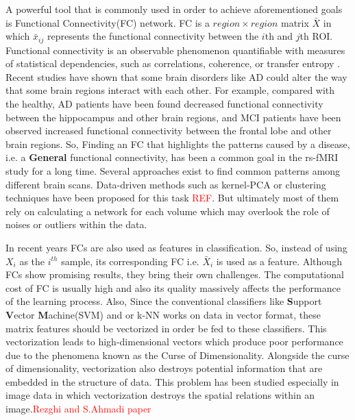 \documentclass[preprint,12pt]{elsarticle}
\begin{document}
	A powerful tool that is commonly used in order to achieve aforementioned goals is Functional Connectivity(FC) network.  FC is a $region \times region$ matrix $\bar{X}$ in which $\bar{x}_{ij}$ represents the functional connectivity between the $i$th and $j$th ROI. Functional connectivity is an observable
		phenomenon quantifiable with measures of statistical dependencies, such as correlations, coherence, or transfer entropy \cite{r38}.  Recent studies have shown that some brain disorders like AD could alter the way that some brain regions interact with each other. For example, compared with the healthy, AD patients have been found decreased functional connectivity between the hippocampus and other brain regions, and MCI patients have been observed increased functional connectivity between the frontal lobe and other brain regions\cite{r04}.
		So, Finding an FC that highlights the patterns caused by a disease, i.e. a \textbf{General} functional connectivity, has been a common goal in the rs-fMRI study for a long time. Several approaches exist to find common patterns among different brain scans. Data-driven methods such as kernel-PCA or clustering techniques have been proposed for this task \textcolor{red}{REF}. But ultimately most of them rely on calculating a network for each volume which may overlook the role of noises or outliers within the data\cite{r53,r54}. 
	
		In recent years FCs are also used as features in classification. 
		So, instead of using $X_i$ as the $i^{th}$ sample, its corresponding  FC i.e. $\bar{X}_i$ is used as a feature. Although FCs show promising results, they bring their own challenges.  The computational cost of FC is usually high and also its quality massively affects the performance of the learning process. Also, Since the conventional classifiers like \textbf{S}upport \textbf{V}ector \textbf{M}achine(SVM) and or k-NN works on data in vector format, these matrix features should be vectorized in order be fed to these classifiers.
		This vectorization leads to high-dimensional vectors which produce poor performance due to the phenomena known as the Curse of Dimensionality. Alongside the curse of dimensionality, vectorization also destroys potential information that are embedded in the structure of data. 
		This problem has been studied especially in image data in which vectorization destroys the spatial relations within an image.\textcolor{red}{Rezghi and S.Ahmadi paper}
						
\end{document}
